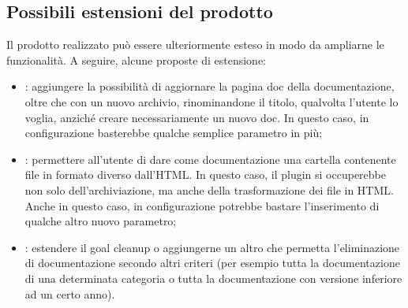 \subsection{Possibili estensioni del prodotto}
Il prodotto realizzato può essere ulteriormente esteso in modo da ampliarne le funzionalità.
A seguire, alcune proposte di estensione:
\begin{itemize}
    \item {}: aggiungere la possibilità di aggiornare la pagina doc della documentazione, oltre che con un nuovo archivio, rinominandone il titolo, qualvolta l'utente lo voglia, anziché creare necessariamente un nuovo doc. In questo caso, in configurazione basterebbe qualche semplice parametro in più;
    \item {}: permettere all'utente di dare come documentazione una cartella contenente file in formato diverso dall'HTML. In questo caso, il plugin si occuperebbe non solo dell'archiviazione, ma anche della trasformazione dei file in HTML. Anche in questo caso, in configurazione potrebbe bastare l'inserimento di qualche altro nuovo parametro;
    \item {}: estendere il goal cleanup o aggiungerne un altro che permetta l'eliminazione di documentazione secondo altri criteri (per esempio tutta la documentazione di una determinata categoria o tutta la documentazione con versione inferiore ad un certo anno).
\end{itemize} 


